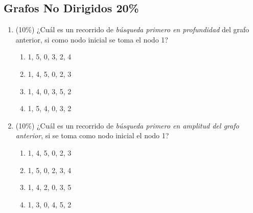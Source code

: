 \documentclass[10 pt]{article}
\begin{document}
\begin{multicols}{2}
	\section{Grafos No Dirigidos 20\%}
	\begin{center}
	\end{center}
	\begin{enumerate}[label=\alph*)]
		\item (10\%) ¿Cuál es un recorrido de \emph{búsqueda primero en profundidad} del grafo anterior, si como nodo inicial se toma el nodo 1?
		\begin{enumerate}[label=\roman*)]
			\item 1, 5, 0, 3, 2, 4
			\item 1, 4, 5, 0, 2, 3
			\item 1, 4, 0, 3, 5, 2
			\item 1, 5, 4, 0, 3, 2
		\end{enumerate}
	    \item (10\%) ¿Cuál es un recorrido de \emph{búsqueda primero en amplitud del grafo anterior}, si se toma como nodo inicial el nodo 1?
	    \begin{enumerate}[label=\roman*)]
	    	\item 1, 4, 5, 0, 2, 3
	    	\item 1, 5, 0, 2, 3, 4
	    	\item 1, 4, 2, 0, 3, 5
	    	\item 1, 3, 0, 4, 5, 2
	    \end{enumerate}
	\end{enumerate}
\end{multicols}
\end{document}
